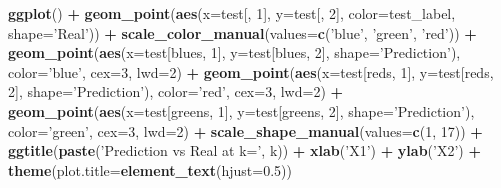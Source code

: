 \documentclass[]{article}
\newenvironment{Shaded}{\begin{snugshade}}{\end{snugshade}}
\newcommand{\DataTypeTok}[1]{\textcolor[rgb]{0.13,0.29,0.53}{#1}}
\newcommand{\DecValTok}[1]{\textcolor[rgb]{0.00,0.00,0.81}{#1}}
\newcommand{\FloatTok}[1]{\textcolor[rgb]{0.00,0.00,0.81}{#1}}
\newcommand{\KeywordTok}[1]{\textcolor[rgb]{0.13,0.29,0.53}{\textbf{#1}}}
\newcommand{\NormalTok}[1]{#1}
\newcommand{\OperatorTok}[1]{\textcolor[rgb]{0.81,0.36,0.00}{\textbf{#1}}}
\newcommand{\StringTok}[1]{\textcolor[rgb]{0.31,0.60,0.02}{#1}}
\begin{document}
\begin{Shaded}
\begin{Highlighting}[]
\KeywordTok{ggplot}\NormalTok{() }\OperatorTok{+}\StringTok{ }\KeywordTok{geom_point}\NormalTok{(}\KeywordTok{aes}\NormalTok{(}\DataTypeTok{x=}\NormalTok{test[, }\DecValTok{1}\NormalTok{], }\DataTypeTok{y=}\NormalTok{test[, }\DecValTok{2}\NormalTok{], }\DataTypeTok{color=}\NormalTok{test_label, }\DataTypeTok{shape=}\StringTok{'Real'}\NormalTok{)) }\OperatorTok{+}\StringTok{ }\KeywordTok{scale_color_manual}\NormalTok{(}\DataTypeTok{values=}\KeywordTok{c}\NormalTok{(}\StringTok{'blue'}\NormalTok{, }\StringTok{'green'}\NormalTok{, }\StringTok{'red'}\NormalTok{)) }\OperatorTok{+}\StringTok{ }\KeywordTok{geom_point}\NormalTok{(}\KeywordTok{aes}\NormalTok{(}\DataTypeTok{x=}\NormalTok{test[blues, }\DecValTok{1}\NormalTok{], }\DataTypeTok{y=}\NormalTok{test[blues, }\DecValTok{2}\NormalTok{], }\DataTypeTok{shape=}\StringTok{'Prediction'}\NormalTok{), }\DataTypeTok{color=}\StringTok{'blue'}\NormalTok{, }\DataTypeTok{cex=}\DecValTok{3}\NormalTok{, }\DataTypeTok{lwd=}\DecValTok{2}\NormalTok{) }\OperatorTok{+}\StringTok{ }\KeywordTok{geom_point}\NormalTok{(}\KeywordTok{aes}\NormalTok{(}\DataTypeTok{x=}\NormalTok{test[reds, }\DecValTok{1}\NormalTok{], }\DataTypeTok{y=}\NormalTok{test[reds, }\DecValTok{2}\NormalTok{], }\DataTypeTok{shape=}\StringTok{'Prediction'}\NormalTok{), }\DataTypeTok{color=}\StringTok{'red'}\NormalTok{, }\DataTypeTok{cex=}\DecValTok{3}\NormalTok{, }\DataTypeTok{lwd=}\DecValTok{2}\NormalTok{) }\OperatorTok{+}\StringTok{ }\KeywordTok{geom_point}\NormalTok{(}\KeywordTok{aes}\NormalTok{(}\DataTypeTok{x=}\NormalTok{test[greens, }\DecValTok{1}\NormalTok{], }\DataTypeTok{y=}\NormalTok{test[greens, }\DecValTok{2}\NormalTok{], }\DataTypeTok{shape=}\StringTok{'Prediction'}\NormalTok{), }\DataTypeTok{color=}\StringTok{'green'}\NormalTok{, }\DataTypeTok{cex=}\DecValTok{3}\NormalTok{, }\DataTypeTok{lwd=}\DecValTok{2}\NormalTok{) }\OperatorTok{+}\StringTok{ }\KeywordTok{scale_shape_manual}\NormalTok{(}\DataTypeTok{values=}\KeywordTok{c}\NormalTok{(}\DecValTok{1}\NormalTok{, }\DecValTok{17}\NormalTok{)) }\OperatorTok{+}\StringTok{ }\KeywordTok{ggtitle}\NormalTok{(}\KeywordTok{paste}\NormalTok{(}\StringTok{'Prediction vs Real at k='}\NormalTok{, k)) }\OperatorTok{+}\StringTok{ }\KeywordTok{xlab}\NormalTok{(}\StringTok{'X1'}\NormalTok{) }\OperatorTok{+}\StringTok{ }\KeywordTok{ylab}\NormalTok{(}\StringTok{'X2'}\NormalTok{) }\OperatorTok{+}\StringTok{ }\KeywordTok{theme}\NormalTok{(}\DataTypeTok{plot.title=}\KeywordTok{element_text}\NormalTok{(}\DataTypeTok{hjust=}\FloatTok{0.5}\NormalTok{))}
\end{Highlighting}
\end{Shaded}
\end{document}
